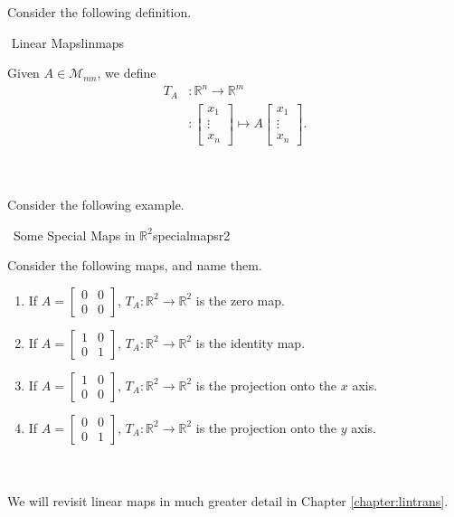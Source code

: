         Consider the following definition.
        \begin{definition}{\Stop\,\,Linear Maps}{linmaps}
        
            Given \(A\in\mathcal{M}_{mn}\), we define
            \begin{align*}
                T_A&:\mathbb{R}^n\to\mathbb{R}^m \\
                &:\begin{bmatrix} x_1 \\ \vdots \\ x_n \end{bmatrix}\mapsto A\begin{bmatrix} x_1 \\ \vdots \\ x_n \end{bmatrix}.
            \end{align*}
            
        \end{definition}
        \vphantom
        \\
        \\
        Consider the following example.
        \begin{example}{\Difficulty\,\Difficulty\,\,Some Special Maps in \(\mathbb{R}^2\)}{specialmapsr2}
            
            Consider the following maps, and name them.
            \begin{enumerate}
                \item If \(A=\begin{bmatrix} 0 & 0 \\ 0 & 0 \end{bmatrix}\), \(T_A:\mathbb{R}^2\to\mathbb{R}^2\) is the zero map.
                \item If \(A=\begin{bmatrix} 1 & 0 \\ 0 & 1 \end{bmatrix}\), \(T_A:\mathbb{R}^2\to\mathbb{R}^2\) is the identity map.
                \item If \(A=\begin{bmatrix} 1 & 0 \\ 0 & 0 \end{bmatrix}\), \(T_A:\mathbb{R}^2\to\mathbb{R}^2\) is the projection onto the \(x\) axis.
                \item If \(A=\begin{bmatrix} 0 & 0 \\ 0 & 1 \end{bmatrix}\), \(T_A:\mathbb{R}^2\to\mathbb{R}^2\) is the projection onto the \(y\) axis.
            \end{enumerate}
            
        \end{example}
        \vphantom
        \\
        \\
        We will revisit linear maps in much greater detail in Chapter \ref{chapter:lintrans}.

